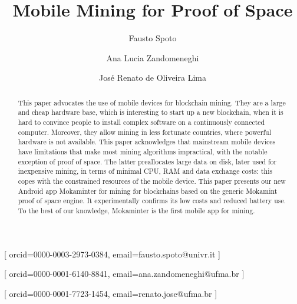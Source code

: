 \documentclass[
]{ceurart}
\begin{document}


\title{Mobile Mining for Proof of Space}

\author[1]{Fausto Spoto}[%
orcid=0000-0003-2973-0384,
email=fausto.spoto@univr.it
]
\cormark[1]
\fnmark[1]
\address[1]{Dipartimento di Informatica, Universit\`a di Verona, Verona, Italy}

\author[2]{Ana Lucia Zandomeneghi}[%
orcid=0000-0001-6140-8841,
email=ana.zandomeneghi@ufma.br
]
\fnmark[1]
\author[2]{Jos\'e Renato de Oliveira Lima}[%
orcid=0000-0001-7723-1454,
email=renato.jose@ufma.br
]
\fnmark[1]
\address[2]{Bacharelado Interdisciplinar em Ci\^encia e Tecnologia (BICT), UFMA, S\~ao Lu\'{\i}s do Maranh\~ao, Brazil}


\maketitle

\begin{abstract}
  This paper advocates the use of mobile devices for blockchain mining.
  They are a large and cheap hardware base, which is
  interesting to start up a new blockchain, when it is
  hard to convince people to install complex software
  on a continuously connected computer. Moreover, they allow mining in less fortunate
  countries, where powerful hardware is not available.
  This paper acknowledges that mainstream mobile devices
  have limitations that make most mining algorithms impractical,
  with the notable exception of proof of space. The latter preallocates
  large data on disk, later used for inexpensive mining,
  in terms of minimal CPU, RAM and data exchange costs: this
  copes with the constrained resources of the mobile device.
  This paper presents our new Android app Mokaminter for mining for blockchains based
  on the generic Mokamint proof of space engine.
  It experimentally confirms its low costs and reduced battery use.
  To the best of our knowledge,
  Mokaminter is the first mobile app for mining.
\end{abstract}
\end{document}
